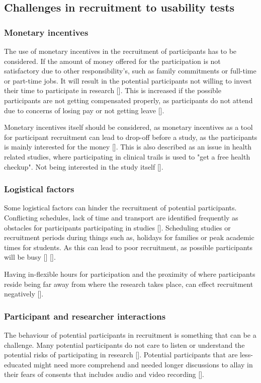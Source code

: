 \subsection{Challenges in recruitment to usability tests}

\subsubsection{Monetary incentives} \label{sec:monetary-incentives}
The use of monetary incentives in the recruitment of participants has to be considered. If the amount of money offered for the participation is not satisfactory due to other responsibility's, such as family commitments or full-time or part-time jobs. It will result in the potential participants not willing to invest their time to participate in research [\cite{pkf_2018}]. This is increased if the possible participants are not getting compensated properly, as participants do not attend due to concerns of losing pay or not getting leave [\cite{nc_2020}].

Monetary incentives itself should be considered, as monetary incentives as a tool for participant recruitment can lead to drop-off before a study, as the participants is mainly interested for the money [\cite{pkf_2018}]. This is also described as an issue in health related studies, where participating in clinical trails is used to "get a free health checkup". Not being interested in the study itself [\cite{nc_2020}].

\subsubsection{Logistical factors}
Some logistical factors can hinder the recruitment of potential participants. Conflicting schedules, lack of time and transport are identified frequently as obstacles for participants participating in studies [\cite{pkf_2018}]. Scheduling studies or recruitment periods during things such as, holidays for families or peak academic times for students. As this can lead to poor recruitment, as possible participants will be busy [\cite{pkf_2018}] [\cite{nc_2020}]. 

Having in-flexible hours for participation and the proximity of where participants reside being far away from where the research takes place, can effect recruitment negatively [\cite{pkf_2018}].

\subsubsection{Participant and researcher interactions} \label{sec:participant-and-researcher-interactions}
The behaviour of potential participants in recruitment is something that can be a challenge. Many potential participants do not care to listen or understand the potential risks of participating in research [\cite{nc_2020}]. Potential participants that are less-educated might need more comprehend and needed longer discussions to allay in their fears of consents that includes audio and video recording [\cite{nc_2020}].

